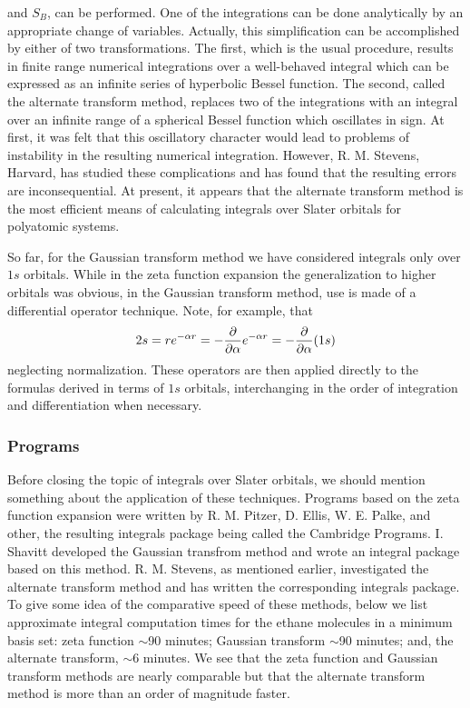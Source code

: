 and $S_B$, can be performed.  One of the integrations can be done 
analytically by an appropriate change of variables.  Actually, this 
simplification can be accomplished by either of two 
transformations.  The first, which is the usual procedure, results 
in finite range numerical integrations over a well-behaved integral 
which can be expressed as an infinite series of hyperbolic Bessel 
function. The second, called the alternate transform method, replaces 
two of the integrations with an integral over an infinite range of a 
spherical Bessel function which oscillates in sign.  At first, it was 
felt that this oscillatory character would lead to problems of
instability in the resulting numerical integration.  However, R. M. Stevens,
Harvard, has studied these complications and has found that the resulting
errors are inconsequential. At present, it appears that the alternate 
transform method is the most efficient means of calculating integrals 
over Slater orbitals for polyatomic systems.

So far, for the Gaussian transform method we have considered integrals
only over $1s$ orbitals. While in the zeta function expansion the 
generalization to higher orbitals was obvious, in the Gaussian transform 
method, use is made of a differential operator technique.  Note, for 
example, that
\begin{equation}
2s = re^{-\alpha r} = - {\partial \over \partial \alpha} e^{-\alpha 
r} = - {\partial \over \partial \alpha} (1s)
\end{equation}
neglecting normalization.  These operators are then applied directly to the
formulas derived in terms of $1s$ orbitals, interchanging in the order of 
integration and differentiation when necessary.

\subsubsection{Programs}

Before closing the topic of integrals over Slater orbitals, we should 
mention something about the application of these techniques. Programs based
on the zeta function expansion were written by R. M. Pitzer, D. Ellis, W.
E. Palke, and other, the resulting integrals package being called the 
Cambridge Programs. I. Shavitt developed the Gaussian transfrom method and
wrote an integral package based on this method. R. M. Stevens, as 
mentioned earlier, investigated the alternate transform method and has written
the corresponding integrals package. To give some idea of the 
comparative speed of these methods, below we list approximate integral 
computation times for the ethane molecules in a minimum basis set: zeta 
function $\sim$90 minutes; Gaussian transform $\sim$90 minutes; and, the 
alternate transform, $\sim$6 minutes.  We see that the zeta function and 
Gaussian transform methods are nearly comparable but that the alternate 
transform method is more than an order of magnitude faster.


